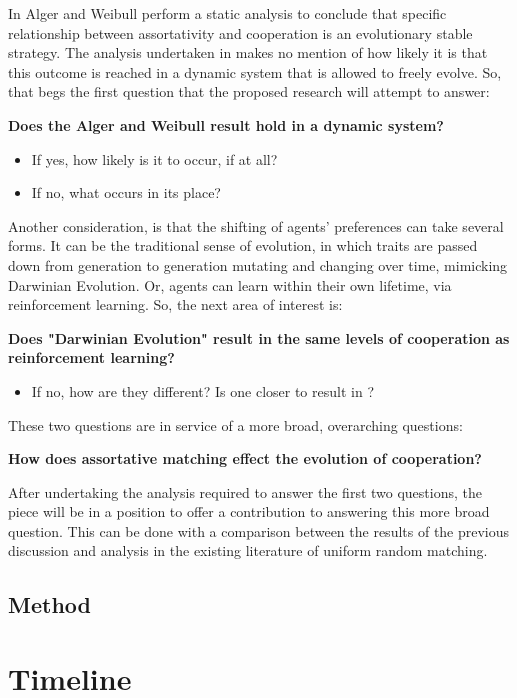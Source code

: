 \documentclass[12pt]{article}
\newcommand*{\np}{\par\noindent\newline}
\begin{document}
In \cite{alger_homo_2013} Alger and Weibull perform a static analysis to
conclude that specific relationship between assortativity and cooperation is an
evolutionary stable strategy. The analysis undertaken in \cite{alger_homo_2013}
makes no mention of how likely it is that this outcome is reached in a dynamic
system that is allowed to freely evolve. So, that begs the first question that
the proposed research will attempt to answer:
\np\textbf{Does the Alger and Weibull result \cite{alger_homo_2013} hold in a dynamic system?}
\begin{itemize}
\item If yes, how likely is it to occur, if at all? 
\item If no, what occurs in its place? 
\end{itemize}
Another consideration, is that the shifting of agents' preferences can take
several forms. It can be the traditional sense of evolution, in which traits
are passed down from generation to generation mutating and changing over time,
mimicking Darwinian Evolution. Or, agents can learn within their own lifetime,
via reinforcement learning. So, the next area of interest is:
\np\textbf{Does "Darwinian Evolution" result in the same levels of cooperation as reinforcement learning?}
\begin{itemize}
\item If no, how are they different? Is one closer to result in \cite{alger_homo_2013}?
\end{itemize}
These two questions are in service of a more broad, overarching questions:
\np\textbf{How does assortative matching effect the evolution of cooperation?}
\np After undertaking the analysis required to answer the first two questions, the piece will be in a position to offer a contribution to answering this more broad question. This can be done with a comparison between the results of the previous discussion and analysis in the existing literature of uniform random matching.
\subsection{Method}
\section{Timeline}


\end{document}
